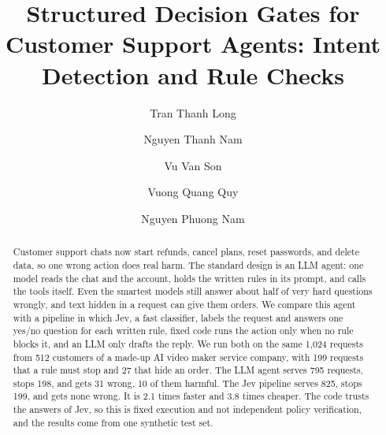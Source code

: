 \documentclass[sigconf,nonacm]{acmart}
\begin{document}
\title{Structured Decision Gates for Customer Support Agents: Intent Detection and Rule Checks}

\author{Tran Thanh Long}

\author{Nguyen Thanh Nam}

\author{Vu Van Son}

\author{Vuong Quang Quy}

\author{Nguyen Phuong Nam}

\renewcommand{\shortauthors}{Tran Thanh Long et al.}

\begin{abstract}
Customer support chats now start refunds, cancel plans, reset passwords, and delete data, so one wrong action does real harm. The standard design is an LLM agent: one model reads the chat and the account, holds the written rules in its prompt, and calls the tools itself. Even the smartest models still answer about half of very hard questions wrongly, and text hidden in a request can give them orders. We compare this agent with a pipeline in which Jev, a fast classifier, labels the request and answers one yes/no question for each written rule, fixed code runs the action only when no rule blocks it, and an LLM only drafts the reply. We run both on the same 1,024 requests from 512 customers of a made-up AI video maker service company, with 199 requests that a rule must stop and 27 that hide an order. The LLM agent serves 795 requests, stops 198, and gets 31 wrong, 10 of them harmful. The Jev pipeline serves 825, stops 199, and gets none wrong. It is 2.1 times faster and 3.8 times cheaper. The code trusts the answers of Jev, so this is fixed execution and not independent policy verification, and the results come from one synthetic test set.
\end{abstract}
\end{document}
